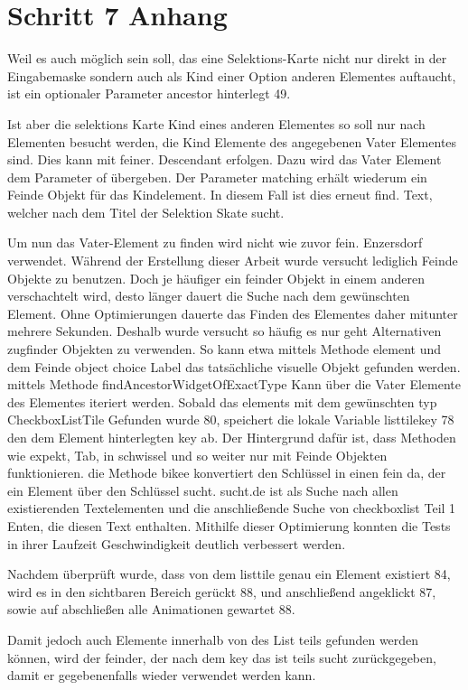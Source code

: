 \section{Schritt 7 Anhang} 
\label{appendix:Schritt7Anhang}


Weil es auch möglich sein soll, das eine Selektions-Karte nicht nur direkt in der Eingabemaske sondern  auch als Kind einer Option anderen Elementes auftaucht, ist ein optionaler Parameter ancestor hinterlegt 49.

Ist aber die selektions Karte Kind eines anderen Elementes  so soll nur nach Elementen besucht werden, die Kind Elemente des angegebenen Vater Elementes sind. Dies kann mit feiner. Descendant erfolgen. Dazu wird das Vater Element dem Parameter of übergeben. Der Parameter matching erhält wiederum ein Feinde Objekt für das Kindelement. In diesem Fall ist dies erneut find. Text, welcher nach dem Titel der Selektion Skate sucht.


Um nun das Vater-Element zu finden wird nicht wie zuvor fein. Enzersdorf verwendet.
Während der Erstellung dieser Arbeit wurde versucht lediglich Feinde Objekte zu benutzen. Doch je häufiger ein feinder Objekt in einem anderen verschachtelt wird, desto länger dauert die Suche nach dem gewünschten Element. Ohne Optimierungen dauerte das Finden des Elementes  daher mitunter mehrere Sekunden. Deshalb wurde versucht so häufig es nur geht Alternativen  zugfinder  Objekten zu verwenden. So kann etwa mittels Methode element  und dem Feinde object choice Label das tatsächliche   visuelle Objekt gefunden werden.  mittels Methode findAncestorWidgetOfExactType Kann über die Vater Elemente des Elementes iteriert werden. Sobald das elements mit dem gewünschten typ CheckboxListTile Gefunden wurde  80,  speichert die lokale Variable listtilekey 78  den dem Element hinterlegten key ab.  Der Hintergrund dafür ist, dass Methoden wie expekt, Tab, in schwissel und so weiter nur mit Feinde Objekten funktionieren.   die Methode bikee   konvertiert den Schlüssel in einen fein da, der ein Element über den Schlüssel sucht.  sucht.de ist als Suche nach allen existierenden Textelementen und die anschließende Suche von checkboxlist Teil 1 Enten, die diesen Text enthalten. Mithilfe dieser Optimierung konnten die Tests in ihrer Laufzeit Geschwindigkeit deutlich verbessert werden.

Nachdem überprüft wurde, dass von dem listtile genau ein Element existiert 84, wird es in den sichtbaren Bereich gerückt 88, und anschließend  angeklickt 87, sowie auf abschließen alle Animationen gewartet 88.


Damit jedoch auch Elemente innerhalb von des List teils gefunden werden können,  wird der feinder, der nach dem key das ist teils sucht zurückgegeben, damit er gegebenenfalls wieder verwendet werden kann.
